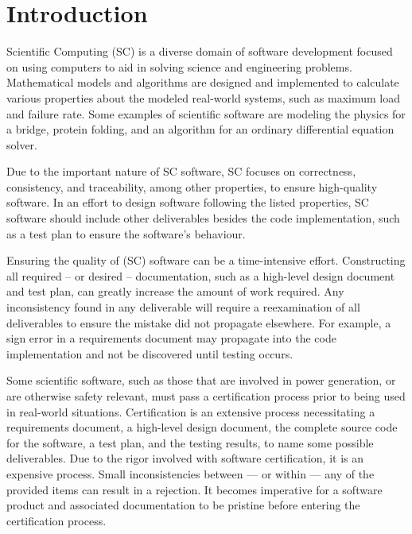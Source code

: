 \chapter{Introduction}\label{intro}
Scientific Computing (SC) is a diverse domain of software development focused on using computers to aid in solving science and engineering problems. Mathematical models and algorithms are designed and implemented to calculate various properties about the modeled real-world systems, such as maximum load and failure rate. Some examples of scientific software are modeling the physics for a bridge, protein folding, and an algorithm for an ordinary differential equation solver.

Due to the important nature of SC software, SC focuses on correctness, consistency, and traceability, among other properties, to ensure high-quality software. In an effort to design software following the listed properties, SC software should include other deliverables besides the code implementation, such as a test plan to ensure the software's behaviour.

Ensuring the quality of (SC) software can be a time-intensive effort. Constructing all required -- or desired -- documentation, such as a high-level design document and test plan, can greatly increase the amount of work required. Any inconsistency found in any deliverable will require a reexamination of all deliverables to ensure the mistake did not propagate elsewhere. For example, a sign error in a requirements document may propagate into the code implementation and not be discovered until testing occurs. 

Some scientific software, such as those that are involved in power generation, or are otherwise safety relevant, must pass a certification process prior to being used in real-world situations. Certification is an extensive process necessitating a requirements document, a high-level design document, the complete source code for the software, a test plan, and the testing results, to name some possible deliverables. Due to the rigor involved with software certification, it is an expensive process. Small inconsistencies between --- or within --- any of the provided items can result in a rejection. It becomes imperative for a software product and associated documentation to be pristine before entering the certification process.

